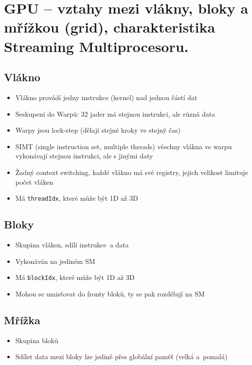 \section{GPU – vztahy mezi vlákny, bloky a mřížkou (grid), charakteristika Streaming Multiprocesoru.}
\subsection{Vlákno}
\begin{itemize}
    \item Vlákno provádí jedny instrukce (kernel) nad jednou částí dat
    \item Seskupení do Warpů: 32 jader má stejnou instrukci, ale různá data
    \item Warpy jsou lock-step (dělají stejné kroky ve stejný čas)
    \item SIMT (single instruction set, multiple threads) všechny vlákna ve warpu vykonávají stejnou instrukci, ale s jinými daty
    \item Žadný context switching, každé vlákno má své registry, jejich velikost limituje počet vláken
    \item Má \texttt{threadIdx}, které může být 1D až 3D
\end{itemize}

\subsection{Bloky}
\begin{itemize}
    \item Skupina vláken, sdílí instrukce~a data
    \item Vykonáván na jediném SM
    \item Má \texttt{blockIdx}, které může být 1D až 3D
    \item Mohou se umisťovat do fronty bloků, ty se pak rozdělují na SM
\end{itemize}

\subsection{Mřížka}
\begin{itemize}
    \item Skupina bloků
    \item Sdílet data mezi bloky lze jedině přes globální paměť (velká a~pomalá)
\end{itemize}

